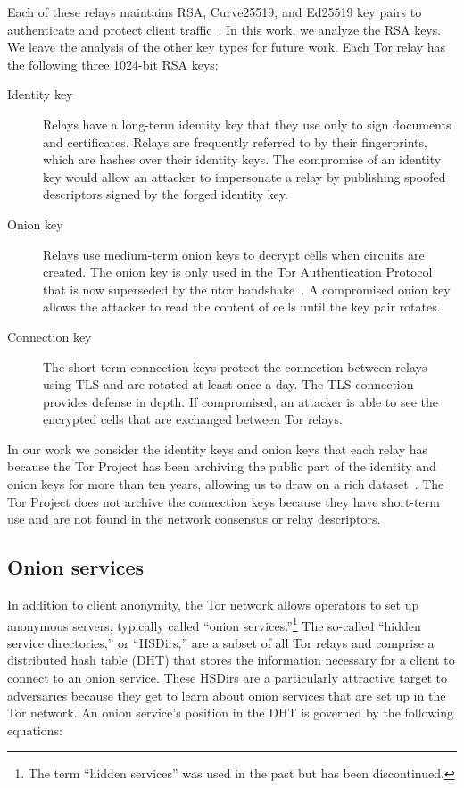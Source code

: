 Each of these relays maintains RSA, Curve25519, and Ed25519 key pairs to
authenticate and protect client traffic~\cite[\S~1.1]{torspec}. In this work, 
we analyze the RSA keys.  We leave the analysis of the other key types for
future work.  Each Tor relay has the following three 1024-bit RSA keys:

\begin{description}
	\item[Identity key] Relays have a long-term identity key that they use only
		to sign documents and certificates.  Relays are frequently referred to
		by their fingerprints, which are hashes over their identity keys.  The
		compromise of an identity key would allow an attacker to impersonate a
		relay by publishing spoofed descriptors signed by the forged identity
		key.

	\item[Onion key]  Relays use medium-term onion keys to decrypt cells when
		circuits are created.  The onion key is only used in the Tor
		Authentication Protocol that is now superseded by the ntor
		handshake~\cite{Goldberg2013a}.  A compromised onion key allows the
		attacker to read the content of cells until the key pair rotates.

	\item[Connection key] The short-term connection keys protect the connection
		between relays using TLS and are rotated at least once a day.  The TLS
		connection provides defense in depth.  If compromised, an attacker is
		able to see the encrypted cells that are exchanged between Tor relays.
\end{description}

In our work we consider the identity keys and onion keys that each relay has
because the Tor Project has been archiving the public part of the identity and
onion keys for more than ten years, allowing us to draw on a rich
dataset~\cite{collector}. The Tor Project does not archive the connection keys
because they have short-term use and are not found in the network consensus or
relay descriptors.

\subsection{Onion services}
In addition to client anonymity, the Tor network allows operators to set up
anonymous servers, typically called ``onion services.''\footnote{The term ``hidden
services'' was used in the past but has been discontinued.} 
The so-called ``hidden service directories,'' or ``HSDirs,'' are a subset of all
Tor relays and comprise a distributed hash table (DHT) that stores the
information necessary for a client to connect to an onion service.  These HSDirs
are a particularly attractive target to adversaries because they get to learn
about onion services that are set up in the Tor network.  An onion service's
position in the DHT is governed by the following equations:

